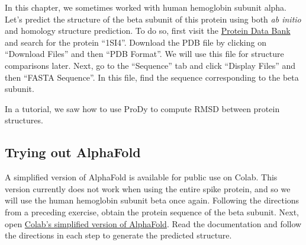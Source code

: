 In this chapter, we sometimes worked with human hemoglobin subunit alpha. Let's predict the structure of the beta subunit of this protein using both \textit{ab initio} and homology structure prediction. To do so, first visit the \href{https://www.rcsb.org/}{Protein Data Bank} and search for the protein ``1SI4''. Download the PDB file by clicking on ``Download Files'' and then ``PDB Format''. We will use this file for structure comparisons later. Next, go to the ``Sequence'' tab and click ``Display Files'' and then ``FASTA Sequence''. In this file, find the sequence corresponding to the beta subunit.\\

\begin{exercise}[%
Submit the beta subunit sequence to the \textit{ab initio} structure prediction software \href{https://zhanggroup.org/QUARK/}{QUARK}, and your choice of homology modeling software: \href{https://swissmodel.expasy.org/}{SWISS-MODEL}, \href{https://robetta.bakerlab.org/}{Robetta}, and/or \href{https://galaxy.seoklab.org/cgi-bin/submit.cgi?type=TBM}{GalaxyWEB}.
]\end{exercise}

In a tutorial, we saw how to use ProDy to compute RMSD between protein structures.\\

\begin{exercise}\end{exercise}

\subsection{Trying out AlphaFold}

A simplified version of AlphaFold is available for public use on Colab. This version currently does not work when using the entire spike protein, and so we will use the human hemoglobin subunit beta once again. Following the directions from a preceding exercise, obtain the protein sequence of the beta subunit. Next, open \href{https://colab.research.google.com/github/deepmind/alphafold/blob/main/notebooks/AlphaFold.ipynb#scrollTo=woIxeCPygt7K}{Colab's simplified version of AlphaFold}. Read the documentation and follow the directions in each step to generate the predicted structure.\\

